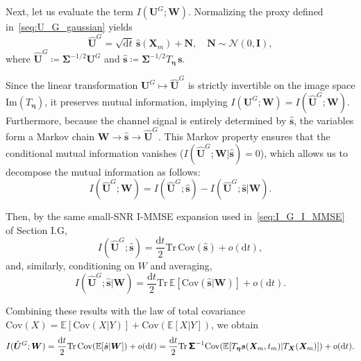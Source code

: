 Next, let us evaluate the term $I(\bm U^G;\bm W)$. Normalizing the proxy defined in~\eqref{seq:U_G_gaussian} yields
\[
    \hat{\bm U}^G=\sqrt{\mathrm dt}\,\hat{\bm s}(\bm X_m)+\bm N,
    \quad\bm N\sim\mathcal N(0,\mathbf I),
\]
where $\hat{\bm U}^G\coloneq\mathbf\Sigma^{-1/2}\bm U^G$ and $\hat{\bm s}\coloneq\mathbf\Sigma^{-1/2}T_{\bm\eta}\,\bm s$. 

Since the linear transformation $\bm U^G\mapsto\hat{\bm U}^G$ is strictly invertible on the image space $\mathrm{Im}(T_{\bm\eta})$, it preserves mutual information, implying $I(\bm U^G;\bm W)=I(\hat{\bm U}^G;\bm W)$. Furthermore, because the channel signal is entirely determined by $\hat{\bm s}$, the variables form a Markov chain $\bm W \to \hat{\bm s} \to \hat{\bm U}^G$.
This Markov property ensures that the conditional mutual information vanishes ($I(\hat{\bm U}^G;\bm W|\hat{\bm s})=0$), which allows us to decompose the mutual information as follows:
\[
    I(\hat{\bm U}^G;\bm W)=
    I(\hat{\bm U}^G;\hat{\bm s})-I(\hat{\bm U}^G;\hat{\bm s}|\bm W).
\]

Then, by the same small-SNR I-MMSE expansion used in~\eqref{seq:I_G_I_MMSE} of Section I.G,
\[
    I(\hat{\bm U}^G;\hat{\bm s})=
    \frac{\mathrm dt}{2}\mathrm{Tr}\,\mathrm{Cov}(\hat{\bm s})+o(\mathrm dt),
\]
and, similarly, conditioning on $W$ and averaging,
\[
    I(\hat{\bm U}^G;\hat{\bm s}|\bm W)=
    \frac{\mathrm dt}{2}\mathrm{Tr}\,
    \mathbb E[\mathrm{Cov}(\hat{\bm s}|\bm W)]+o(\mathrm dt).
\]

Combining these results with the law of total covariance $\mathrm{Cov}(X)=\mathbb E[\mathrm{Cov}(X|Y)]+\mathrm{Cov}(\mathbb E[X|Y])$, we obtain
\begin{equation}
    I(\hat{\bm U}^G;\bm W)=
    \frac{\mathrm dt}{2}\mathrm{Tr}\,\mathrm{Cov}
    (\mathbb E[\hat{\bm s}|\bm W])+o(\mathrm dt)
    =
    \frac{\mathrm dt}{2}\mathrm{Tr}\,\boldsymbol{\mathsf{\Sigma}}^{-1}\mathrm{Cov}
    (\mathbb E[T_{\bm\eta}\bm s(\bm X_m,t_m)|T_{\bm X}(\bm X_m)])+o(\mathrm dt).
    \label{seq:I_U_hat_G_W_I_MMSE}
\end{equation}

